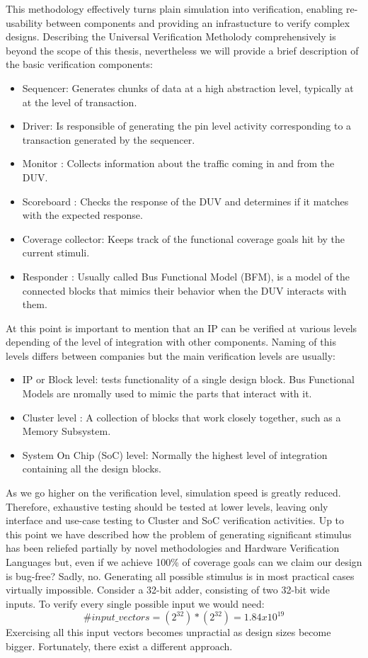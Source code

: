 \documentclass[a4paper,11pt]{article}
\begin{document}
This methodology effectively turns plain simulation into verification, enabling re-usability between components and providing an infrastucture to verify complex designs. Describing the Universal Verification Metholody comprehensively is beyond the scope of this thesis, nevertheless we will provide a brief description of the basic verification components:
\begin{itemize}
\item Sequencer: Generates chunks of data at a high abstraction level, typically at at the level of transaction. 
\item Driver: Is responsible of generating the pin level activity corresponding to a transaction generated by the sequencer. 
\item Monitor : Collects information about the traffic coming in and from the DUV.
\item Scoreboard :  Checks the response of the DUV and determines if it matches with the expected response.
\item Coverage collector: Keeps track of the functional coverage goals hit by the current stimuli.
\item Responder : Usually called Bus Functional Model (BFM), is a model of the connected blocks that mimics their behavior when the DUV interacts with them.
\end{itemize}
At this point is important to mention that an IP can be verified at various levels depending of the level of integration with other components. Naming of this levels differs between companies but the main verification levels are usually:
\begin{itemize}
\item IP or Block level: tests functionality of a single design block. Bus Functional Models are nromally used to mimic the parts that interact with it.
\item Cluster level : A collection of blocks that work closely together, such as a Memory Subsystem. 
\item System On Chip (SoC) level: Normally the highest level of integration containing all the design blocks.
\end{itemize}
As we go higher on the verification level, simulation speed is greatly reduced. Therefore, exhaustive testing should be tested at lower levels, leaving only interface and use-case testing to Cluster and SoC verification activities. 
Up to this point we have described how the problem of generating significant stimulus has been reliefed partially by novel methodologies and Hardware Verification Languages but, even if we achieve 100\% of coverage goals can we claim our design is bug-free? Sadly, no. Generating all possible stimulus is in most practical cases virtually impossible. Consider a 32-bit adder, consisting of two 32-bit wide inputs. To verify every single possible input we would need:
\begin{equation}
\#input\_vectors = (2^{32}) * (2^{32}) = 1.84 x 10^{19}
\end{equation} 
Exercising all this input vectors becomes unpractial as design sizes become bigger. Fortunately, there exist a different approach.
\pagebreak
\end{document}
